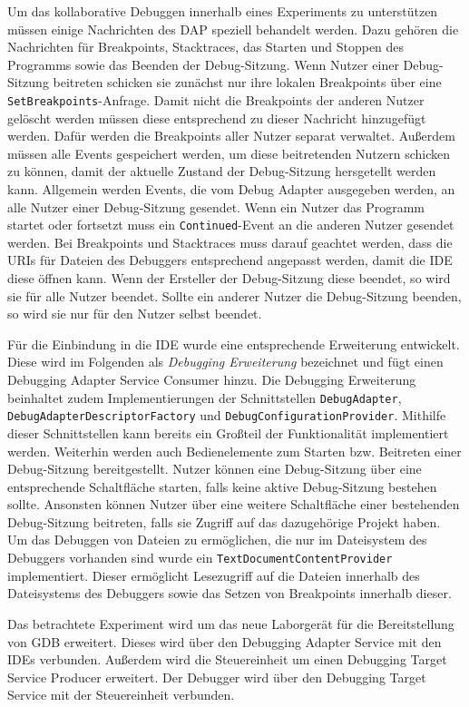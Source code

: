 Um das kollaborative Debuggen innerhalb eines Experiments zu unterstützen müssen einige Nachrichten des \ac{DAP} speziell behandelt werden. Dazu gehören die Nachrichten für Breakpoints, Stacktraces, das Starten und Stoppen des Programms sowie das Beenden der Debug-Sitzung. Wenn Nutzer einer Debug-Sitzung beitreten schicken sie zunächst nur ihre lokalen Breakpoints über eine \texttt{SetBreakpoints}-Anfrage. Damit nicht die Breakpoints der anderen Nutzer gelöscht werden müssen diese entsprechend zu dieser Nachricht hinzugefügt werden. Dafür werden die Breakpoints aller Nutzer separat verwaltet. Außerdem müssen alle Events gespeichert werden, um diese beitretenden Nutzern schicken zu können, damit der aktuelle Zustand der Debug-Sitzung hersgetellt werden kann. Allgemein werden Events, die vom Debug Adapter ausgegeben werden, an alle Nutzer einer Debug-Sitzung gesendet. Wenn ein Nutzer das Programm startet oder fortsetzt muss ein \texttt{Continued}-Event an die anderen Nutzer gesendet werden. Bei Breakpoints und Stacktraces muss darauf geachtet werden, dass die URIs für Dateien des Debuggers entsprechend angepasst werden, damit die IDE diese öffnen kann. Wenn der Ersteller der Debug-Sitzung diese beendet, so wird sie für alle Nutzer beendet. Sollte ein anderer Nutzer die Debug-Sitzung beenden, so wird sie nur für den Nutzer selbst beendet.

Für die Einbindung in die IDE wurde eine entsprechende Erweiterung entwickelt. Diese wird im Folgenden als \textit{Debugging Erweiterung} bezeichnet und fügt einen Debugging Adapter Service Consumer hinzu. Die Debugging Erweiterung beinhaltet zudem Implementierungen der Schnittstellen \texttt{DebugAdapter}, \texttt{DebugAdapterDescriptorFactory} und \texttt{DebugConfigurationProvider}. Mithilfe dieser Schnittstellen kann bereits ein Großteil der Funktionalität implementiert werden. Weiterhin werden auch Bedienelemente zum Starten bzw. Beitreten einer Debug-Sitzung bereitgestellt. Nutzer können eine Debug-Sitzung über eine entsprechende Schaltfläche starten, falls keine aktive Debug-Sitzung bestehen sollte. Ansonsten können Nutzer über eine weitere Schaltfläche einer bestehenden Debug-Sitzung beitreten, falls sie Zugriff auf das dazugehörige Projekt haben. Um das Debuggen von Dateien zu ermöglichen, die nur im Dateisystem des Debuggers vorhanden sind wurde ein \texttt{TextDocumentContentProvider} implementiert. Dieser ermöglicht Lesezugriff auf die Dateien innerhalb des Dateisystems des Debuggers sowie das Setzen von Breakpoints innerhalb dieser.

Das betrachtete Experiment wird um das neue Laborgerät für die Bereitstellung von GDB erweitert. Dieses wird über den Debugging Adapter Service mit den IDEs verbunden. Außerdem wird die Steuereinheit um einen Debugging Target Service Producer erweitert. Der Debugger wird über den Debugging Target Service mit der Steuereinheit verbunden.
